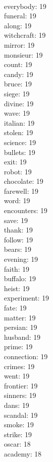 \begin{multicols}{6}
  \\ everybody: 19
  \\ funeral: 19
  \\ along: 19
  \\ witchcraft: 19
  \\ mirror: 19
  \\ monsieur: 19
  \\ count: 19
  \\ candy: 19
  \\ bruce: 19
  \\ siege: 19
  \\ divine: 19
  \\ wave: 19
  \\ italian: 19
  \\ stolen: 19
  \\ science: 19
  \\ bullets: 19
  \\ exit: 19
  \\ robot: 19
  \\ chocolate: 19
  \\ farewell: 19
  \\ word: 19
  \\ encounters: 19
  \\ save: 19
  \\ thank: 19
  \\ follow: 19
  \\ bears: 19
  \\ evening: 19
  \\ faith: 19
  \\ buffalo: 19
  \\ heist: 19
  \\ experiment: 19
  \\ fate: 19
  \\ matter: 19
  \\ persian: 19
  \\ husband: 19
  \\ prime: 19
  \\ connection: 19
  \\ crimes: 19
  \\ went: 19
  \\ frontier: 19
  \\ sinners: 19
  \\ dans: 19
  \\ scandal: 19
  \\ smoke: 19
  \\ strike: 19
  \\ oscar: 18
  \\ academy: 18

\end{multicols}
